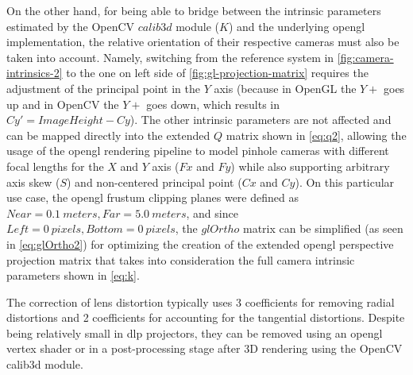 On the other hand, for being able to bridge between the intrinsic parameters estimated by the OpenCV $calib3d$ module ($K$) and the underlying \gls{opengl} implementation, the relative orientation of their respective cameras must also be taken into account. Namely, switching from the reference system in \cref{fig:camera-intrinsics-2} to the one on left side of \cref{fig:gl-projection-matrix} requires the adjustment of the principal point in the $Y$ axis (because in OpenGL the $Y+$ goes up and in OpenCV the $Y+$ goes down, which results in $Cy'=ImageHeight-Cy$). The other intrinsic parameters are not affected and can be mapped directly into the extended $Q$ matrix shown in \cref{eq:q2}, allowing the usage of the \gls{opengl} rendering pipeline to model pinhole cameras with different focal lengths for the $X$ and $Y$ axis ($Fx$ and $Fy$) while also supporting arbitrary axis skew ($S$) and non-centered principal point ($Cx$ and $Cy$). On this particular use case, the \gls{opengl} frustum clipping planes were defined as $Near=0.1\ meters, Far=5.0\ meters$, and since $Left=0\ pixels, Bottom=0\ pixels$, the $glOrtho$ matrix can be simplified (as seen in \cref{eq:glOrtho2}) for optimizing the creation of the extended \gls{opengl} perspective projection matrix that takes into consideration the full camera intrinsic parameters shown in \cref{eq:k}.

The correction of lens distortion typically uses 3 coefficients for removing radial distortions and 2 coefficients for accounting for the tangential distortions. Despite being relatively small in \gls{dlp} projectors, they can be removed using an \gls{opengl} vertex shader or in a post-processing stage after 3D rendering using the OpenCV calib3d module.

